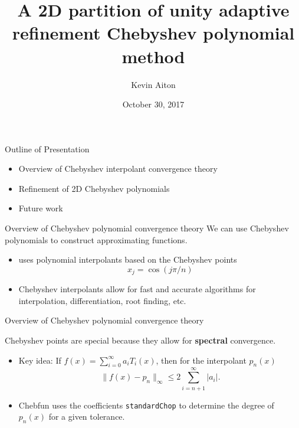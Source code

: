 \documentclass{beamer}
\title[Optimal Domain Splitting]{A 2D partition of unity adaptive refinement Chebyshev polynomial method}
\author[K. Aiton]{Kevin Aiton}
\institute[UD]{
  Department of Mathematics\\
University of Delaware\\
}
\date[October 2016]{October 30, 2017}
\begin{document}
%
%
\begin{frame}[plain]
  \titlepage
\end{frame}

%
%

\begin{frame}[plain]{Outline of Presentation}

\begin{itemize}
	\item Overview of Chebyshev interpolant convergence theory
	\item Refinement of 2D Chebyshev polynomials
	\item Future work
\end{itemize}
\end{frame}

%
%
\begin{frame}{Overview of Chebyshev polynomial convergence theory}
We can use Chebyshev polynomials to construct approximating functions.
\begin{itemize}
\item {} uses polynomial interpolants based on the Chebyshev points $$x_j = \cos(j\pi/n)$$	
\item Chebyshev interpolants allow for fast and accurate algorithms for interpolation, differentiation, root finding, etc.
\end{itemize}


\end{frame}

\begin{frame}{Overview of Chebyshev polynomial convergence theory}

Chebyshev points are special because they allow for \textbf{spectral} convergence.

\begin{itemize}
\item Key idea: If $f(x) = \sum_{i=0}^{\infty} a_i T_i(x)$, then for the interpolant $p_n(x)$ $$ \|f(x) - p_n \|_{\infty} \leq 2 \sum_{i=n+1}^{\infty} |a_i|.$$
\item Chebfun uses the coefficients {\tt standardChop} to determine the degree of $p_n(x)$ for a given tolerance.
\end{itemize}

\end{frame}
\end{document}
